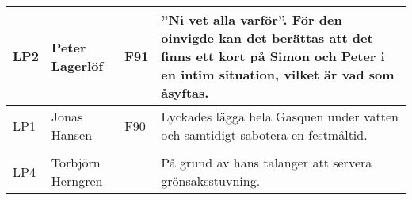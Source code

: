 \documentclass[a4paper]{article}
\begin{document}
\begin{longtable}{p{5mm}>{\raggedright\arraybackslash}p{30mm}p{10mm}p{108mm}}
LP2 & Peter Lagerlöf & F91 & ''Ni vet alla varför''. För den oinvigde kan det berättas att det finns ett kort på Simon och Peter i en intim situation, vilket är vad som åsyftas. \\ \hline

LP1 & Jonas Hansen & F90 & Lyckades lägga hela Gasquen under vatten och samtidigt sabotera en festmåltid. \\ \hline

\rowcolor{veryLightGray} \multicolumn{4}{l}{\textbf{1974/1975}} \\ \hline

LP4 & Torbjörn Herngren & & På grund av hans talanger att servera grönsaksstuvning. \\ \hline

\end{longtable}

\newpage
{}
\end{document}
